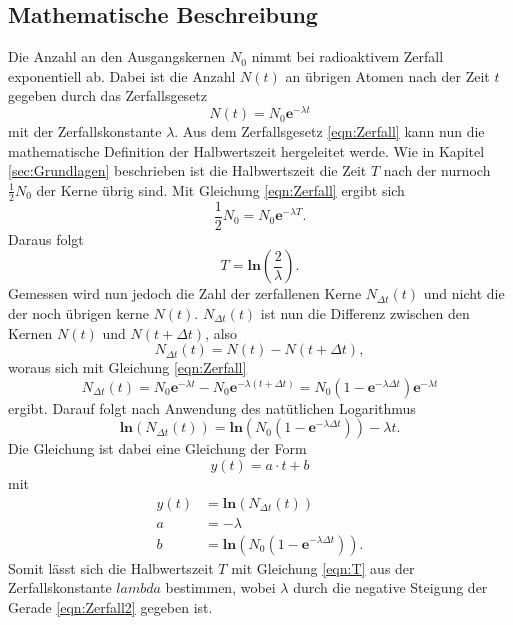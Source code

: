 \subsection{Mathematische Beschreibung}
\label{sec:mathe}
Die Anzahl an den Ausgangskernen $N_0$ nimmt bei radioaktivem Zerfall exponentiell ab. Dabei ist die Anzahl 
$N(t)$ an übrigen Atomen nach der Zeit $t$ gegeben durch das Zerfallsgesetz
\begin{equation}
    N(t)=N_0\textbf{e}^{-\lambda t} 
    \label{eqn:Zerfall}
\end{equation}
mit der Zerfallskonstante $\lambda$. Aus dem Zerfallsgesetz \ref{eqn:Zerfall} kann nun die mathematische
Definition der Halbwertszeit hergeleitet werde. Wie in Kapitel \ref{sec:Grundlagen} beschrieben ist die 
Halbwertszeit die Zeit $T$ nach der nurnoch $\frac{1}{2}N_0$ der Kerne übrig sind. Mit Gleichung 
\ref{eqn:Zerfall} ergibt sich
\begin{equation*}
    \frac{1}{2}N_0=N_0\textbf{e}^{-\lambda T}.
\end{equation*}
Daraus folgt 
\begin{equation}
    T=\textbf{ln}\left(\frac{2}{\lambda}\right) 
    \label{eqn:T}.
\end{equation}
Gemessen wird nun jedoch die Zahl der zerfallenen Kerne $N_{\Delta t}(t)$ und nicht die der noch übrigen
kerne $N(t)$. $N_{\Delta t}(t)$ ist nun die Differenz zwischen den Kernen $N(t)$ und $N(t+\Delta t)$, also
\begin{equation*}
    N_{\Delta t}(t)=N(t)-N(t+\Delta t) 
    \label{eqn:Zerfall},
\end{equation*}
woraus sich mit Gleichung \ref{eqn:Zerfall}
\begin{equation*}
    N_{\Delta t}(t)=N_0\textbf{e}^{-\lambda t}-N_0\textbf{e}^{-\lambda (t+\Delta t)}
    =N_0(1-\textbf{e}^{-\lambda \Delta t})\textbf{e}^{-\lambda t}
\end{equation*}
ergibt. Darauf folgt nach Anwendung des natütlichen Logarithmus 
\begin{equation}
    \textbf{ln}(N_{\Delta t}(t))
    =\textbf{ln}(N_0(1-\textbf{e}^{-\lambda \Delta t}))-\lambda t 
    \label{eqn:Zerfall2}.
\end{equation}
Die Gleichung \label{eqn:Zerfall} ist dabei eine Gleichung der Form 
\begin{equation}
    y(t)=a\cdot t+b 
    \label{eqn:gerade}
\end{equation}
mit
\begin{align*}
    y(t)&=\textbf{ln}(N_{\Delta t}(t))\\
    a&=-\lambda\\
    b&=\textbf{ln}(N_0(1-\textbf{e}^{-\lambda \Delta t})).
\end{align*}
Somit lässt sich die Halbwertszeit $T$ mit Gleichung \ref{eqn:T} aus der Zerfallskonstante $lambda$
bestimmen, wobei $\lambda$ durch die negative Steigung der Gerade \ref{eqn:Zerfall2} gegeben ist.
